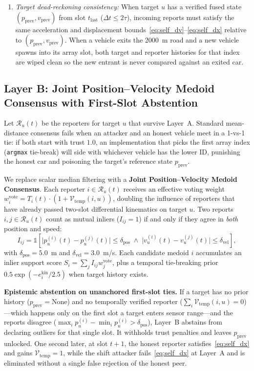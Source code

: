 \documentclass[conference]{IEEEtran}
\begin{document}
\begin{enumerate}
\item \textit{Target dead-reckoning consistency:} When target $u$ has a verified fused state $(p_{\mathrm{prev}}, v_{\mathrm{prev}})$ from slot $t_{\mathrm{last}}$ ($\Delta t \le 2\tau$), incoming reports must satisfy the same acceleration and displacement bounds~\eqref{eq:self_dv}--\eqref{eq:self_dx} relative to $(p_{\mathrm{prev}}, v_{\mathrm{prev}})$. When a vehicle exits the 2000~m road and a new vehicle spawns into its array slot, both target and reporter histories for that index are wiped clean so the new entrant is never compared against an exited car.
\end{enumerate}

\subsection{Layer B: Joint Position--Velocity Medoid Consensus with First-Slot Abstention}
Let $\mathcal{R}_u(t)$ be the reporters for target $u$ that survive Layer~A. Standard mean-distance consensus fails when an attacker and an honest vehicle meet in a 1-vs-1 tie: if both start with trust $1.0$, an implementation that picks the first array index (\texttt{argmax} tie-break) will side with whichever vehicle has the lower ID, punishing the honest car and poisoning the target's reference state $p_{\mathrm{prev}}$.

We replace scalar median filtering with a \textbf{Joint Position--Velocity Medoid Consensus}. Each reporter $i\in\mathcal{R}_u(t)$ receives an effective voting weight $w^{\mathrm{vote}}_i = T_i(t)\cdot (1 + \mathcal{V}_{\mathrm{temp}}(i,u))$, doubling the influence of reporters that have already passed two-slot differential kinematics on target $u$. Two reports $i,j\in\mathcal{R}_u(t)$ count as mutual inliers ($I_{ij}=1$) if and only if they agree in \emph{both} position and speed:
\begin{equation}
I_{ij} = \mathbb{1}\!\left[\big|p^{(i)}_u(t)-p^{(j)}_u(t)\big|\le \delta_{\mathrm{pos}}\;\wedge\;\big|v^{(i)}_u(t)-v^{(j)}_u(t)\big|\le \delta_{\mathrm{vel}}\right],
\label{eq:joint_inlier}
\end{equation}
with $\delta_{\mathrm{pos}}=5.0$~m and $\delta_{\mathrm{vel}}=3.0$~m/s. Each candidate medoid $i$ accumulates an inlier support score $S_i = \sum_j I_{ij} w^{\mathrm{vote}}_j$, plus a temporal tie-breaking prior $0.5\exp(-e^{\mathrm{kin}}_i/2.5)$ when target history exists.

\textbf{Epistemic abstention on unanchored first-slot ties.} If a target has no prior history ($p_{\mathrm{prev}}=\text{None}$) and no temporally verified reporter ($\sum_i \mathcal{V}_{\mathrm{temp}}(i,u)=0$)---which happens only on the first slot a target enters sensor range---and the reports disagree ($\max_i p^{(i)}_u - \min_i p^{(i)}_u > \delta_{\mathrm{pos}}$), Layer~B abstains from declaring outliers for that single slot. It withholds trust penalties and leaves $p_{\mathrm{prev}}$ unlocked. One second later, at slot $t+1$, the honest reporter satisfies~\eqref{eq:self_dx} and gains $\mathcal{V}_{\mathrm{temp}}=1$, while the shift attacker fails~\eqref{eq:self_dx} at Layer~A and is eliminated without a single false rejection of the honest peer.
\end{document}
